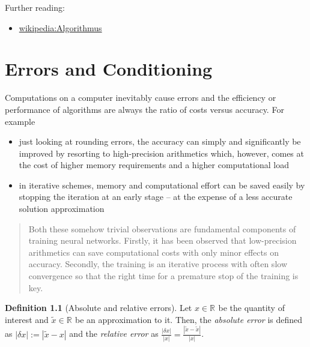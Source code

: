 \documentclass[
]{book}
\providecommand{\tightlist}{%
  \setlength{\itemsep}{0pt}\setlength{\parskip}{0pt}}
\newenvironment {JHSAYS} [0] {\begin{quote}\color{jhsc}} {\end{quote}}
\theoremstyle{definition}
\newtheorem{definition}{Definition}[chapter]
\theoremstyle{definition}
\theoremstyle{definition}
\theoremstyle{definition}
\theoremstyle{remark}
\begin{document}
Further reading:

\begin{itemize}
\tightlist
\item
  \href{https://de.wikipedia.org/wiki/Algorithmus\#Definition}{wikipedia:Algorithmus}
\end{itemize}

\hypertarget{errors-and-conditioning}{%
\chapter{Errors and Conditioning}\label{errors-and-conditioning}}

\def\kij{(\kappa_{A,x})_{ij}}

Computations on a computer inevitably cause errors and the efficiency or performance of algorithms are always the ratio of costs versus accuracy.
For example

\begin{itemize}
\item
  just looking at rounding errors, the accuracy can simply and significantly be improved by resorting to high-precision arithmetics which, however, comes at the cost of higher memory requirements and a higher computational load
\item
  in iterative schemes, memory and computational effort can be saved easily by stopping the iteration at an early stage -- at the expense of a less accurate solution approximation
\end{itemize}

\leavevmode\hypertarget{rem-accu-iter}{}%
\begin{JHSAYS}
Both these somehow trivial observations are fundamental components of training neural networks. Firstly, it has been observed that low-precision arithmetics can save computational costs with only minor effects on accuracy. Secondly, the training is an iterative process with often slow convergence so that the right time for a premature stop of the training is key.

\end{JHSAYS}

\begin{definition}[Absolute and relative errors]
\protect\hypertarget{def:errors}{}\label{def:errors}Let \(x\in\mathbb R^{}\) be the quantity of interest and \(\tilde x \in \mathbb R^{}\) be an approximation to it. Then, the \emph{absolute error} is defined as \(|\delta x|:=|\tilde x- x|\) and the \emph{relative error} as \(\frac{|\delta x|}{|x|}=\frac{|\tilde x-\tilde x|}{|x|}\).
\end{definition}
\end{document}
